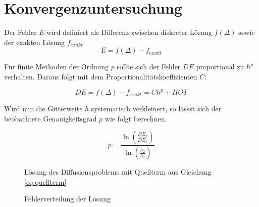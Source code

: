 \documentclass[10pt, ngerman,colorback,accentcolor=tud2d]{tudreport}
\begin{document}
\section{Konvergenzuntersuchung}
\label{sec:Konvergenzuntersuchung}

Der Fehler $E$ wird definiert als Differenz zwischen diskreter Lösung $f(\Delta)$ sowie
der exakten Lösung $f_{exakt}$.
\begin{equation*}
  E=f(\Delta) - f_{exakt}
\end{equation*}

Für finite Methoden der Ordnung $p$ sollte sich der Fehler $DE$ proportional zu
$h^p$ verhalten. Daraus folgt mit dem Proportionalitätskoeffizienten $C$:

\begin{equation*}
  DE=f(\Delta) - f_{exakt}=C h^p + HOT
\end{equation*}

Wird nun die Gitterweite $h$ systematisch verkleinert, so lässst sich der beobachtete
Genauigkeitsgrad $p$ wie folgt berechnen.

\begin{equation}
  p=\frac{\ln \left(\frac{DE_2}{DE_1}\right)}{\ln \left(\frac{h_2}{h_1}\right)}
\end{equation}

\begin{figure}
\caption{Lösung des Diffusionsproblems mit Quellterm aus Gleichung \ref{eq:quellterm}}
\end{figure}

\begin{figure}
\caption{Fehlerverteilung der Lösung}
\end{figure}
\end{document}

